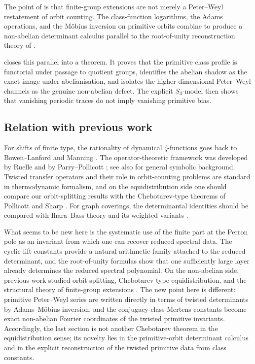The point of  is that finite-group extensions are
not merely a Peter--Weyl restatement of orbit counting. The
class-function logarithms, the Adams operations, and the M\"obius
inversion on primitive orbits combine to produce a non-abelian
determinant calculus parallel to the root-of-unity reconstruction
theory of .

 closes this parallel into a theorem. It proves that
the primitive class profile is functorial under passage to quotient
groups, identifies the abelian shadow as the exact image under
abelianisation, and isolates the higher-dimensional Peter--Weyl
channels as the genuine non-abelian defect. The explicit \(S_3\)-model
then shows that vanishing periodic traces do not imply vanishing
primitive bias.

\subsection{Relation with previous work}

For shifts of finite type, the rationality of dynamical
\(\zeta\)-functions goes back to Bowen--Lanford and Manning
\cite{BowenLanford1970Zeta,Manning1971Axiom}. The operator-theoretic
framework was developed by Ruelle and by Parry--Pollicott
\cite{Ruelle1976ZetaExpanding,Ruelle1978Thermodynamic,ParryPollicott1990Zeta};
see also \cite{LindMarcus1995,Kitchens1998} for general symbolic
background. Twisted transfer operators and their role in orbit-counting
problems are standard in thermodynamic formalism, and on the
equidistribution side one should compare our orbit-splitting results
with the Chebotarev-type theorems of Pollicott and Sharp
\cite{PollicottSharp2007Chebotarev}. For graph coverings, the
determinantal identities should be compared with Ihara--Bass theory and
its weighted variants
\cite{Bass1992Ihara,ChoeKwakParkSato2007Bartholdi,Sato2008WeightedBartholdiCoverings}.

What seems to be new here is the systematic use of the finite part at
the Perron pole as an invariant from which one can recover reduced
spectral data. The cyclic-lift constants provide a natural arithmetic
family attached to the reduced determinant, and the root-of-unity
formulas show that one sufficiently large layer already determines the
reduced spectral polynomial. On the non-abelian side, previous work
studied orbit splitting, Chebotarev-type equidistribution, and the
structural theory of finite-group extensions
\cite{ParryPollicott1986Chebotarev,NooraniParry1992ChebotarevShifts,BoyleSchmieding2017FiniteGroupExtensions,Parry1999LivsicNonAbelian}.
The new point here is different: primitive Peter--Weyl series are
written directly in terms of twisted determinants by Adams--M\"obius
inversion, and the conjugacy-class Mertens constants become exact
non-abelian Fourier coordinates of the twisted primitive invariants.
Accordingly, the last section is not another Chebotarev theorem in the
equidistribution sense; its novelty lies in the primitive-orbit
determinant calculus and in the explicit reconstruction of the twisted
primitive data from class constants.

